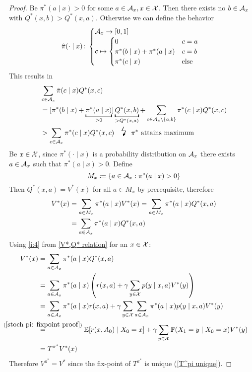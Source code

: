 \begin{proof}
	\xToy{\ref{ii:3}}{\ref{ii:4}} 
	Be \(\pi^*(a\mid x)>0\) for some \(a\in\mathcal{A}_x,x\in\mathcal{X}\). Then there exists no \(b\in\mathcal{A}_x\) with \(Q^*(x,b)>Q^*(x,a)\). Otherwise we can define the behavior
	\[
		\hat{\pi}(\cdot\mid x)\colon
		\begin{cases}
			\mathcal{A}_x\to[0,1]\\
			c\mapsto 
			\begin{cases}
				0 & c=a \\
				\pi^*(b\mid x) + \pi^*(a\mid x) & c=b\\
				\pi^*(c\mid x) & \text{else}
			\end{cases}
		\end{cases}
	\]
	This results in
	\begin{align*}
		&\sum_{c\in\cA_x} \hat{\pi}(c\mid x) Q^*(x,c)\\
		&=[\pi^*(b\mid x) %
		+ \underbracket[1pt]{\pi^*(a\mid x)}_{>0}] \underbracket[1pt]{Q^*(x,b)}_{>Q^*(x,a)}
		+\sum_{c\in\cA_x\setminus \{a,b\}} \pi^*(c\mid x)Q^*(x,c)\\
		&> \sum_{c\in\cA_x} \pi^*(c\mid x) Q^*(x,c) \contradiction{\pi^* \text{ attains maximum}}
	\end{align*}
	\xToy{\ref{ii:4}}{\ref{ii:2}} Be \(x\in\mathcal{X}\), since \(\pi^*(\cdot\mid x)\) is a probability distribution on \(\mathcal{A}_x\) there exists \(a\in\mathcal{A}_x\) such that \(\pi^*(a\mid x)>0\). Define
	\[
		M_x\coloneqq \{a\in\mathcal{A}_x:\pi^*(a\mid x)>0 \}
	\]
	Then \(Q^*(x,a)=V^*(x)\) for all \(a\in M_x\) by prerequisite, therefore
	\begin{align*}
		V^*(x)&= \sum_{a\in M_x} \pi^*(a\mid x) V^*(x) 
		= \sum_{a\in M_x} \pi^*(a\mid x)Q^*(x,a)\\
		&=\sum_{a\in \mathcal{A}_x} \pi^*(a\mid x)Q^*(x,a)
	\end{align*}
	\xToy{\ref{ii:2}}{\ref{ii:1}} Using \ref{i:4} from \ref{V*,Q* relation} for an \(x\in\mathcal{X}\):
	\begin{align*}
		V^*(x)&=\sum_{a\in \cA_x} \pi^*(a\mid x)Q^*(x,a)\\
		&=\sum_{a\in \cA_x} \pi^*(a\mid x) 
		\left(r(x,a)+\gamma \sum\limits_{y\in\cX}p(y\mid x,a) V^*(y)\right)\\
		&=\sum_{a\in \cA_x}\pi^*(a\mid x)r(x,a)
		+\gamma \sum_{y\in\cX} \sum_{a\in\cA_x}\pi^*(a\mid x)p(y\mid x,a)V^*(y)\\
		&\lxeq{(\ref{stoch pi: fixpoint proof})}\E[r(x,A_0)\mid X_0=x] 
		+ \gamma \sum_{y\in\cX}\Pr(X_1=y\mid X_0 =x) V^*(y)\\
		&=T^{\pi^*} V^*(x)
	\end{align*}
	Therefore \(V^{\pi^*} = V^*\) since the fix-point of \(T^{\pi^*}\) is unique (\ref{T^pi unique}).
\end{proof}
